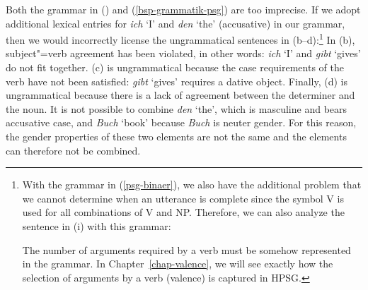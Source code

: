 Both the grammar in () and (\ref{bsp-grammatik-psg}) are too imprecise.
If we adopt additional lexical entries for \emph{ich} `I' and \emph{den} `the' (accusative) in our grammar, then we would incorrectly
license the ungrammatical sentences in (b--d):\footnote{\label{fn-ex-das-kind-erwartet}%
	With the grammar in (\ref{psg-binaer}), we also have the additional problem that we cannot determine when an utterance is complete
	since the symbol V is used for all combinations of V and NP. Therefore, we can also analyze the sentence in (i) with this grammar:
  
\eal
{}
\zl
The number of arguments required by a verb must be somehow represented in the grammar. In Chapter~\ref{chap-valence}, we will see exactly
how the selection of arguments by a verb (valence) is captured in HPSG.
}
\eal
{}
\zl
In (b), subject"=verb agreement has been violated, in other words: \emph{ich} `I' and \emph{gibt} `gives' do not fit together.
(c) is ungrammatical because the case requirements of the verb have not been satisfied: \emph{gibt} `gives' requires a dative object. Finally, (d) is ungrammatical
because there is a lack of agreement between the determiner and the noun. It is not possible to combine \emph{den} `the', which is masculine and bears accusative case, 
and \emph{Buch} `book' because \emph{Buch} is neuter gender. For this reason, the gender properties
of these two elements are not the same and the elements can therefore not be combined.

